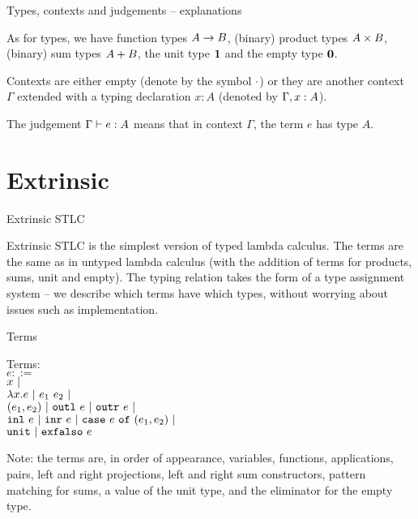 \documentclass{beamer}
\begin{document}
\begin{frame}{Types, contexts and judgements -- explanations}

As for types, we have function types $A \to B$, (binary) product types $A \times B$, (binary) sum types $A + B$, the unit type $\textbf{1}$ and the empty type $\textbf{0}$.

\vspace{2em}

Contexts are either empty (denote by the symbol $\cdot$) or they are another context $\Gamma$ extended with a typing declaration $x : A$ (denoted by $\Gamma, x : A$).

\vspace{2em}

The judgement $\Gamma \vdash e : A$ means that in context $\Gamma$, the term $e$ has type $A$.

\end{frame}

\section{Extrinsic}

\begin{frame}{Extrinsic STLC}

Extrinsic STLC is the simplest version of typed lambda calculus. The terms are the same as in untyped lambda calculus (with the addition of terms for products, sums, unit and empty). The typing relation takes the form of a type assignment system -- we describe which terms have which types, without worrying about issues such as implementation.

\end{frame}

\begin{frame}{Terms}

Terms: \\
$e ::=$ \\
\qquad $x \ |\ $ \\
\qquad $\lambda x. e \ |\  e_1\ e_2 \ |\ $ \\
\qquad $(e_1, e_2) \ |\  \texttt{outl}\ e \ |\  \texttt{outr}\ e \ |\ $ \\
\qquad $\texttt{inl}\ e \ |\  \texttt{inr}\ e \ |\  \texttt{case}\ e\ \texttt{of}\ (e_1, e_2) \ |\ $ \\
\qquad $\texttt{unit} \ |\  \texttt{exfalso}\ e$

\vspace{2em}

Note: the terms are, in order of appearance, variables, functions, applications, pairs, left and right projections, left and right sum constructors, pattern matching for sums, a value of the unit type, and the eliminator for the empty type.

\end{frame}
\end{document}
